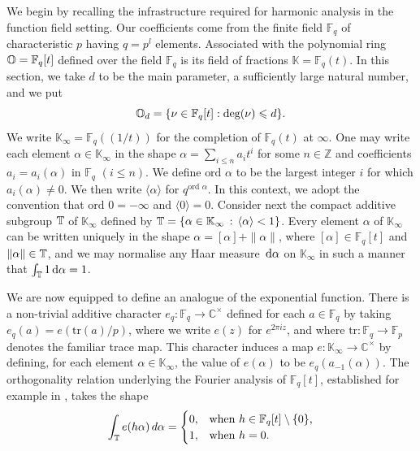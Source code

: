 \documentclass[12pt,reqno]{amsart}
\theoremstyle{definition}
\theoremstyle{remark}
\numberwithin{equation}{section}
\def\dbC{{\mathbb C}}\def\dbD{{\mathbb D}}
\def\dbF{{\mathbb F}}\def\dbK{{\mathbb K}}
\def\dbZ{{\mathbb Z}}\def\dbQ{{\mathbb Q}}
\def\alp{{\alpha}} \def\bfalp{{\boldsymbol \alpha}}
\def\le{\leqslant} \def\ge{\geqslant} \def\pleq{\preccurlyeq} \def\ple{\prec}
\def\d{{\,{\rm d}}}
\begin{document}
We begin by recalling the infrastructure required for harmonic analysis in the function field 
setting. Our coefficients come from the finite field $\dbF_q$ of characteristic $p$ having 
$q=p^l$ elements. Associated with the polynomial ring $\dbO=\dbF_q[t]$ defined over the 
field $\dbF_q$ is its field of fractions $\dbK=\dbF_q(t)$. In this section, we take $d$ to be 
the main parameter, a sufficiently large natural number, and we put
$$\dbO_d=\{ \nu \in \dbF_q[t]: \text{deg}(\nu)\le d\}.$$
We write $\dbK_\infty =\dbF_q((1/t))$ for the completion of $\dbF_q(t)$ at $\infty$. One 
may write each element $\alp \in \dbK_\infty $ in the shape $\alp =\sum_{i\le n}a_it^i$ for 
some $n\in \dbZ$ and coefficients $a_i=a_i(\alp )$ in $\dbF_q$ $(i\le n)$. We define 
$\text{ord }\alp $ to be the largest integer $i$ for which $a_i(\alp )\ne 0$. We then write 
$\langle \alp \rangle$ for $q^{\text{ord }\alp}$. In this context, we adopt the convention 
that $\text{ord }0=-\infty$ and $\langle 0\rangle =0$. Consider next the compact additive 
subgroup ${\mathbb T} $ of $\dbK_\infty $ defined by 
$\dbT =\{ \alp \in \dbK_\infty \,:\, \langle \alp \rangle <1\}$. Every element $\alp $ of 
$\dbK_\infty $ can be written uniquely in the shape $\alp =[\alp ]+\| \alp \|$, where 
$[\alp ]\in \dbF_q[t]$ and $\| \alp \| \in \dbT $, and we may normalise any Haar measure 
$\d\alp $ on $\dbK_\infty $ in such a manner that $\int_\dbT 1\d\alp =1$.\par

We are now equipped to define an analogue of the exponential function. There is a 
non-trivial additive character $e_q:\dbF_q\rightarrow \dbC^\times$ defined for each 
$a\in \dbF_q$ by taking $e_q(a)=e(\text{tr}(a)/p)$, where we write $e(z)$ for 
$e^{2\pi iz}$, and where $\text{tr}\!:\!\dbF_q\rightarrow \dbF_p$ denotes the familiar 
trace map. This character induces a map $e:\dbK_\infty \rightarrow \dbC^\times$ by 
defining, for each element $\alp \in \dbK_\infty$, the value of $e(\alp)$ to be 
$e_q(a_{-1}(\alp ))$. The orthogonality relation underlying the Fourier analysis of 
$\dbF_q[t]$, established for example in \cite[Lemma 1]{Kub1974}, takes the shape
\begin{equation}\label{17.1}
\int_\dbT e(h\alp)\,d\alp =\begin{cases} 0,&\text{when $h\in \dbF_q[t]\setminus 
\{ 0\}$,}\\1,&\text{when $h=0$}.\end{cases}
\end{equation}
\end{document}
